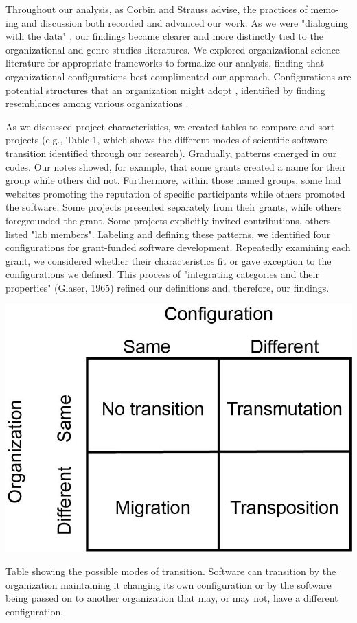\documentclass[sigchi-a,screen]{acmart}
\begin{document}
Throughout our analysis, as Corbin and Strauss \cite{corbin_basics_2014} advise, the practices of memo-ing and discussion both recorded and advanced our work. As we were "dialoguing with the data" \cite[page 106]{corbin_basics_2014}, our findings became clearer and more distinctly tied to the organizational and genre studies literatures. We explored organizational science literature for appropriate frameworks to formalize our analysis, finding that organizational configurations \cite{fiss_set-theoretic_2007} \cite{mintzberg_structure_1980} best complimented our approach. Configurations are potential structures that an organization might adopt \cite{mintzberg_structure_1980}, identified by finding resemblances among various organizations \cite{short_research_2008}.

As we discussed project characteristics, we created tables to compare and sort projects (e.g., Table 1, which shows the different modes of scientific software transition identified through our research). Gradually, patterns emerged in our codes. Our notes showed, for example, that some grants created a name for their group while others did not. Furthermore, within those named groups, some had websites promoting the reputation of specific participants while others promoted the software. Some projects presented separately from their grants, while others foregrounded the grant. Some projects explicitly invited contributions, others listed "lab members". Labeling and defining these patterns, we identified four configurations for grant-funded software development. Repeatedly examining each grant, we considered whether their characteristics fit or gave exception to the configurations we defined. This process of "integrating categories and their properties" (Glaser, 1965) refined our definitions and, therefore, our findings. 

\begin{marginfigure}
    \centering
    \includegraphics{images/2x2.jpg}
    \caption{Table showing the possible modes of transition. Software can transition by the organization maintaining it changing its own configuration or by the software being passed on to another organization that may, or may not, have a different configuration.}
    \label{fig:table1}
\end{marginfigure}
\end{document}
